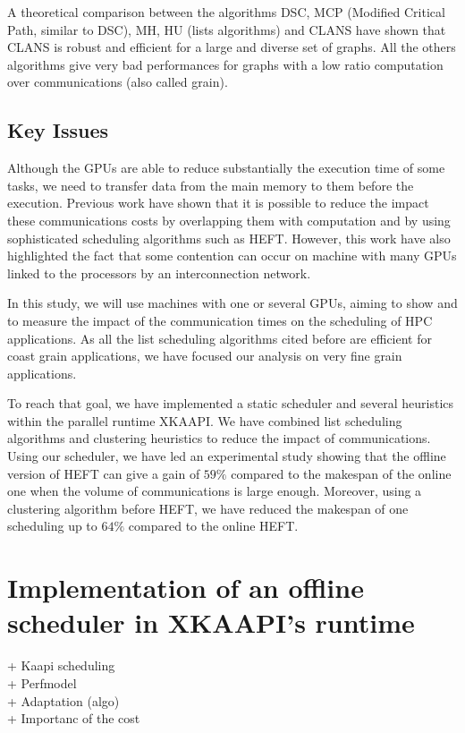 \documentclass[10pt, conference, compsocconf,pdftex,usenames,dvipsnames]{IEEEtran}
\newcommand{\mytodo}[1]{\todo[inline]{#1}}
\begin{document}
A theoretical comparison\cite{khan1994comparison} between the algorithms DSC,
MCP (Modified Critical Path, similar to DSC), MH, HU (lists algorithms) and
CLANS have shown that CLANS is robust and efficient for a large and diverse
set of graphs. All the others algorithms give very bad performances for graphs
with a low ratio computation over communications (also called grain). 

\subsection{Key Issues}

Although the GPUs are able to reduce substantially the execution time of
some tasks, we need to transfer data from the main memory to them before
the execution. Previous work\cite{ferreiralima:hal-00735470} have shown
that it is possible to reduce the impact these communications costs by
overlapping them with computation and by using sophisticated scheduling
algorithms such as HEFT.  However, this work have also highlighted the
fact that some contention can occur on machine with many GPUs linked to
the processors by an interconnection network.

In this study, we will use machines with one or several GPUs, aiming to
show and to measure the impact of the communication times on the
scheduling of HPC applications. As all the list scheduling algorithms cited
before are efficient for coast grain applications, we have focused our
analysis on very fine grain applications. 

To reach that goal, we have implemented a static scheduler and several
heuristics within the parallel runtime XKAAPI. We have combined list
scheduling algorithms and clustering heuristics to reduce the impact of
communications. Using our scheduler, we have led an experimental study
showing that the offline version of HEFT can give a gain of $59\%$
compared to the makespan of the online one when the volume of
communications is large enough. Moreover, using a clustering algorithm
before HEFT, we have reduced the makespan of one scheduling up to $64\%$
compared to the online HEFT.


\mytodo{Continue here}
\section{Implementation of an offline scheduler in XKAAPI's runtime}
+ Kaapi scheduling
\\
+ Perfmodel 
\\
+ Adaptation (algo)
\\
+ Importanc of the cost
\end{document}
